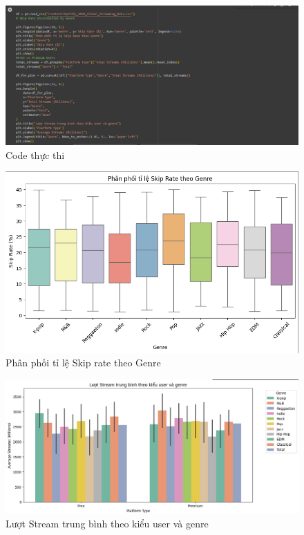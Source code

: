 \begin{figure}[H]
    \centering
    \includegraphics[width=1\linewidth]{../graphics/data2/11.png}
    \caption{Code thực thi}
    \label{fig:placeholder}
\end{figure}
\begin{figure}[H]
    \centering
    \includegraphics[width=1\linewidth]{../graphics/data2/12.png}
    \caption{Phân phối tỉ lệ Skip rate theo Genre}
    \label{fig:placeholder}
\end{figure}
\begin{figure}[H]
    \centering
    \includegraphics[width=1\linewidth]{../graphics/data2/13.png}
    \caption{Lượt Stream trung bình theo kiểu user và genre}
    \label{fig:placeholder}
\end{figure}

